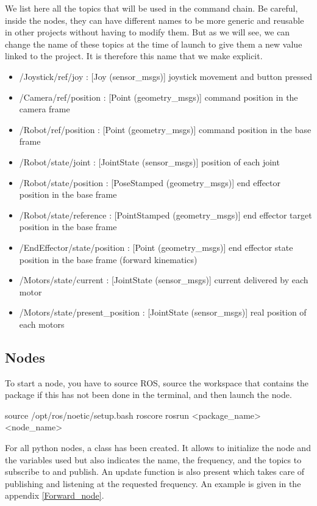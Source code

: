 We list here all the topics that will be used in the command chain. Be careful, inside the nodes, they can have different names to be more generic and reusable in other projects without having to modify them. But as we will see, we can change the name of these topics at the time of launch to give them a new value linked to the project. It is therefore this name that we make explicit. 
\begin{itemize}
    \item /Joystick/ref/joy : [Joy (sensor\_msgs)] joystick movement and button pressed
    \item /Camera/ref/position : [Point (geometry\_msgs)] command position in the camera frame
    \item /Robot/ref/position : [Point (geometry\_msgs)] command position in the base frame
    \item /Robot/state/joint : [JointState (sensor\_msgs)] position of each joint
    \item /Robot/state/position : [PoseStamped (geometry\_msgs)] end effector position in the base frame
    \item /Robot/state/reference : [PointStamped (geometry\_msgs)] end effector target position in the base frame
    \item /EndEffector/state/position : [Point (geometry\_msgs)] end effector state position in the base frame (forward kinematics)
    \item /Motors/state/current : [JointState (sensor\_msgs)] current delivered by each motor
    \item /Motors/state/present\_position : [JointState (sensor\_msgs)] real position of each motors
\end{itemize}

\subsection{Nodes}
To start a node, you have to source ROS, source the workspace that contains the package if this has not been done in the terminal, and then launch the node.
\begin{commandshell}
    source /opt/ros/noetic/setup.bash
    roscore
    rosrun <package_name> <node_name>
\end{commandshell}

\bigbreak
For all python nodes, a class has been created. It allows to initialize the node and the variables used but also indicates the name, the frequency, and the topics to subscribe to and publish. An update function is also present which takes care of publishing and listening at the requested frequency. An example is given in the appendix \ref{Forward_node}.

